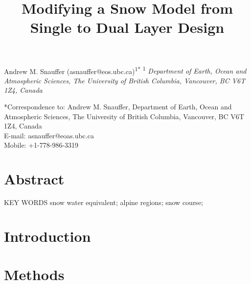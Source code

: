 \documentclass[12pt]{article}
\title{Modifying a Snow Model from Single to Dual Layer Design}
\author{}
\date{}
\begin{document}
\maketitle
\begin{center}
Andrew M. Snauffer (asnauffer@eos.ubc.ca)\textsuperscript{1*}
\newline
\newline
\footnotesize{
\textsuperscript{1}\textit{
Department of Earth, Ocean and Atmospheric Sciences,
The University of British Columbia,
Vancouver, BC V6T 1Z4,
Canada}
}
\end{center}

\begin{footnotesize}
\noindent
*Correspondence to: Andrew M. Snauffer, 
Department of Earth, Ocean and Atmospheric Sciences,
The University of British Columbia,
Vancouver, BC V6T 1Z4,
Canada
\\E-mail: asnauffer@eoas.ubc.ca
\\Mobile: +1-778-986-3319

\end{footnotesize}

\newpage

\section{Abstract}

\bigskip
\noindent KEY WORDS \: snow water equivalent; alpine regions; snow course; 

\section{Introduction}


\section{Methods}

\citep{walter2005process}
\end{document}
